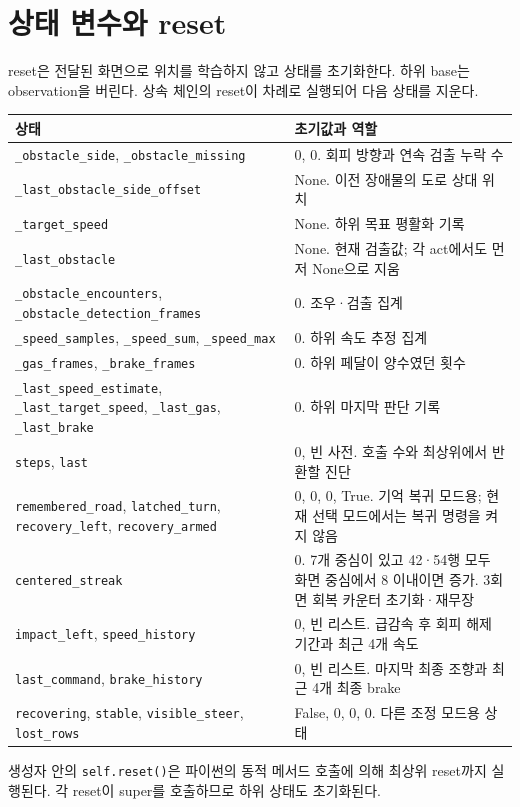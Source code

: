 \documentclass[11pt,a4paper]{article}
\newcommand{\code}[1]{{\small\nolinkurl{#1}}}
\begin{document}
\section{상태 변수와 reset}
reset은 전달된 화면으로 위치를 학습하지 않고 상태를 초기화한다. 하위 base는 observation을 버린다. 상속 체인의 reset이 차례로 실행되어 다음 상태를 지운다.
\begin{longtable}{@{}p{69mm}p{91mm}@{}}\toprule
상태 & 초기값과 역할 \\\midrule\endhead
\code{_obstacle_side}, \code{_obstacle_missing} & 0, 0. 회피 방향과 연속 검출 누락 수 \\
\code{_last_obstacle_side_offset} & None. 이전 장애물의 도로 상대 위치 \\
\code{_target_speed} & None. 하위 목표 평활화 기록 \\
\code{_last_obstacle} & None. 현재 검출값; 각 act에서도 먼저 None으로 지움 \\
\code{_obstacle_encounters}, \code{_obstacle_detection_frames} & 0. 조우·검출 집계 \\
\code{_speed_samples}, \code{_speed_sum}, \code{_speed_max} & 0. 하위 속도 추정 집계 \\
\code{_gas_frames}, \code{_brake_frames} & 0. 하위 페달이 양수였던 횟수 \\
\code{_last_speed_estimate}, \code{_last_target_speed}, \code{_last_gas}, \code{_last_brake} & 0. 하위 마지막 판단 기록 \\
\code{steps}, \code{last} & 0, 빈 사전. 호출 수와 최상위에서 반환할 진단 \\
\code{remembered_road}, \code{latched_turn}, \code{recovery_left}, \code{recovery_armed} & 0, 0, 0, True. 기억 복귀 모드용; 현재 선택 모드에서는 복귀 명령을 켜지 않음 \\
\code{centered_streak} & 0. 7개 중심이 있고 42·54행 모두 화면 중심에서 8 이내이면 증가. 3회면 회복 카운터 초기화·재무장 \\
\code{impact_left}, \code{speed_history} & 0, 빈 리스트. 급감속 후 회피 해제 기간과 최근 4개 속도 \\
\code{last_command}, \code{brake_history} & 0, 빈 리스트. 마지막 최종 조향과 최근 4개 최종 brake \\
\code{recovering}, \code{stable}, \code{visible_steer}, \code{lost_rows} & False, 0, 0, 0. 다른 조정 모드용 상태 \\\bottomrule
\end{longtable}
생성자 안의 \code{self.reset()}은 파이썬의 동적 메서드 호출에 의해 최상위 reset까지 실행된다. 각 reset이 super를 호출하므로 하위 상태도 초기화된다.
\end{document}
